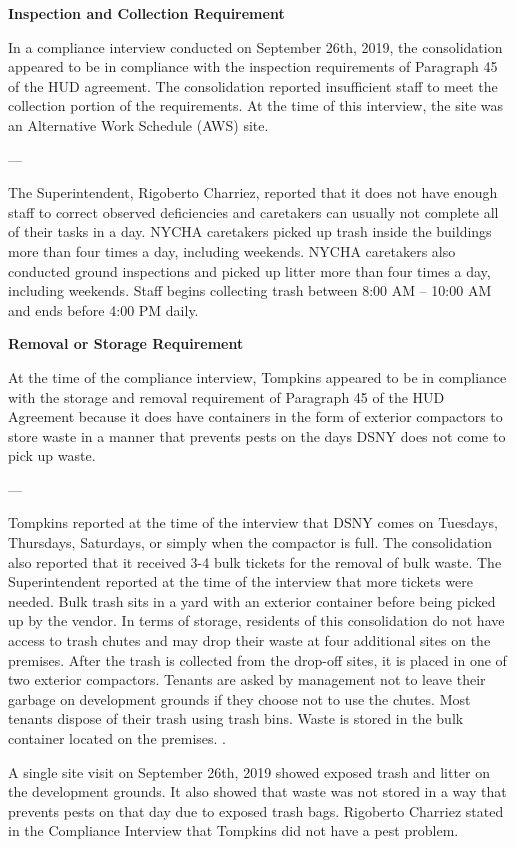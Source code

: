 
\textbf{Inspection and Collection Requirement}

In a compliance interview conducted on September 26th, 2019, the consolidation appeared to be in compliance with the inspection requirements of Paragraph 45 of the HUD agreement. The consolidation reported insufficient staff to meet the collection portion of the requirements. At the time of this interview, the site was an Alternative Work Schedule (AWS) site. 

---

The Superintendent, Rigoberto Charriez, reported that it does not have enough staff to correct observed deficiencies and caretakers can usually not complete all of their tasks in a day. NYCHA caretakers picked up trash inside the buildings more than four times a day, including weekends. NYCHA caretakers also conducted ground inspections and picked up litter more than four times a day, including weekends. Staff begins collecting trash between 8:00 AM -- 10:00 AM and ends before 4:00 PM daily.

\textbf{Removal or Storage Requirement}

At the time of the compliance interview, Tompkins appeared to be in compliance with the storage and removal requirement of Paragraph 45 of the HUD Agreement because it does have containers in the form of exterior compactors to store waste in a manner that prevents pests on the days DSNY does not come to pick up waste. 

---

Tompkins reported at the time of the interview that DSNY comes on Tuesdays, Thursdays, Saturdays, or simply when the compactor is full. The consolidation also reported that it received 3-4 bulk tickets for the removal of bulk waste. The Superintendent reported at the time of the interview that more tickets were needed. Bulk trash sits in a yard with an exterior container before being picked up by the vendor. In terms of storage, residents of this consolidation do not have access to trash chutes and may drop their waste at four additional sites on the premises. After the trash is collected from the drop-off sites, it is placed in one of two exterior compactors. Tenants are asked by management not to leave their garbage on development grounds if they choose not to use the chutes. Most tenants dispose of their trash using trash bins. Waste is stored in the bulk container located on the premises. . 

A single site visit on September 26th, 2019 showed exposed trash and litter on the development grounds. It also showed that waste was not stored in a way that prevents pests on that day due to exposed trash bags. Rigoberto Charriez stated in the Compliance Interview that Tompkins did not have a pest problem.

